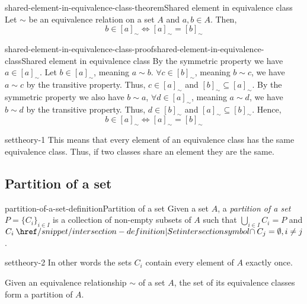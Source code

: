 \documentclass[preview]{standalone}
\begin{document}
\begin{snippettheorem}{shared-element-in-equivalence-class-theorem}{Shared element in equivalence class}
    Let \(\sim\) be an equivalence relation on a set \(A\)
    and \(a,b \in A\).
    Then,
    \[
        b \in {[a]}_{\sim} \iff {[a]}_{\sim} = {[b]}_{\sim}
    \]
\end{snippettheorem}

\begin{snippetproof}{shared-element-in-equivalence-class-proof}{shared-element-in-equivalence-class}{Shared element in equivalence class}
    By the symmetric property we have \(a \in {[a]}_{\sim}\).
    Let \(b \in {[a]}_{\sim}\), meaning \(a \sim b\). \(\forall c \in {[b]}_{\sim}\),
    meaning \(b \sim c\), we have \(a \sim c\) by the transitive property.
    Thus, \(c \in {[a]}_{\sim}\) and \({[b]}_{\sim} \subseteq {[a]}_{\sim}\).
    By the symmetric property we also have \(b \sim a\),
    \(\forall d \in {[a]}_{\sim}\), meaning \(a \sim d\), we have
    \(b \sim d\) by the transitive property. Thus, \(d \in {[b]}_{\sim}\)
    and \({[a]}_{\sim} \subseteq {[b]}_{\sim}\). Hence,
    \[
        b \in {[a]}_{\sim} \iff {[a]}_{\sim} = {[b]}_{\sim}
    \]
\end{snippetproof}

\begin{snippet}{settheory-1}
This means that every element of an equivalence class has the same equivalence class.
Thus, if two classes share an element they are the same.
\end{snippet}

\subsection{Partition of a set}

\begin{snippetdefinition}{partition-of-a-set-definition}{Partition of a set}
    Given a set \(A\), a \textit{partition of a set} \(P={\{C_i\}}_{i\in I}\) is a collection of
    non-empty subsets of \(A\) such that \(\bigcup_{i\in I} C_i = P\) and
    \(C_i \intersection C_j = \emptyset, i \neq j\).
\end{snippetdefinition}

\begin{snippet}{settheory-2}
In other words the sets \(C_i\)
contain every element of \(A\) exactly once.

Given an equivalence relationship \(\sim\) of a set \(A\),
the set of its equivalence classes form a partition of \(A\).
\end{snippet}
\end{document}
